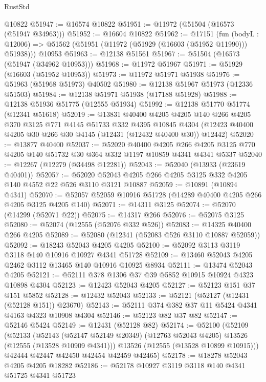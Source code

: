 \begin{lexlean}{RustStd}
\begin{coremodule}
    @10822
@51947 := @16574 @10822
@51951 := @11972 (@51504 (@16573 (@51947 @34963)))
@51952 := @16604 @10822
@51962 := @17151
    (fun (bodyL : @12006) => @51562 (@51951 (@11972 (@51929 (@16603 (@51952 @11990))) @51938)))
    @10953
@51963 := @12138 @51561
@51967 := @51504 (@16573 (@51947 (@34962 @10953)))
@51968 := @11972 @51967
@51971 := @51929 (@16603 (@51952 @10953))
@51973 := @11972 @51971 @51938
@51976 := @51963 (@51968 @51973) @40502
@51980 := @12138 @51967 @51973 (@12336 @51503)
@51984 := @12138 @51971 @51938 (@17188 @51928)
@51988 := @12138 @51936 @51775 (@12555 @51934)
@51992 := @12138 @51770 @51774 (@12341 @51618)
@52019 := @13831
    @40400
    @4205
    @4205
    @140
    @266
    @4205
    @370
    @3125
    @771
    @4145
    @51733
    @332
    @4395
    @10845
    @4304
    (@12423 @40400 @4205 @30 @266 @30 @4145 (@12431 (@12432 @40400 @30)) @12442)
@52020 := @13877 @40400
@52037 := @52020
    @40400
    @4205
    @266
    @4205
    @3125
    @770
    @4205
    @140
    @51732
    @30
    @364
    @332
    @1197
    @10859
    @4341
    @4341
    @5337
@52040 := @12267 (@12279 (@34498 @12281))
@52043 := @52040 (@13933 (@23619 @40401))
@52057 := @52020 @52043 @4205 @266 @4205 @3125 @332 @4205 @140 @4552 @22 @526 @3110 @3121 @10887
@52059 := @10891 (@10894 @4341)
@52070 := @52057 @52059 @10916 @51728 (@14289 @40400 @4205 @266 @4205 @3125 @4205 @140)
@52071 := @14311 @3125
@52074 := @52070 (@14299 (@52071 @22))
@52075 := @14317 @266
@52076 := @52075 @3125
@52080 := @52074 (@12555 (@52076 @332 @526))
@52083 := @14325 @40400 @266 @4205
@52089 := @52080 (@12341 (@52083 @526 @3110 @10887 @52059))
@52092 := @18243 @52043 @4205 @4205
@52100 := @52092 @3113 @3119 @3118 @140 @10916 @10927 @4341 @51728
@52109 := @13460 @52043 @4205 @2462 @3112 @13465 @140 @10916 @10925 @8934
@52111 := @13474 @52043 @4205
@52121 := @52111 @378 @1306 @37 @39 @5852 @10915 @10924 @4323 @10898 @4304
@52123 := @12423 @52043 @4205
@52127 := @52123 @151 @37 @151 @5852
@52128 := @12432 @52043
@52133 := @52121 (@52127 (@12431 (@52128 @151)) @23670)
@52143 := @52111 @374 @382 @37 @11 @5424 @4341 @4163 @4323 @10908 @4304
@52146 := @52123 @82 @37 @82
@52147 := @52146 @5424
@52149 := @12431 (@52128 @82)
@52174 := @52100
    (@52109
      (@52133
        (@52143 (@52147 @52149 @20349) (@12763 @52043 @4205) @13526 (@12555 (@13528 @10909 @4341)))
        @13526
        (@12555 (@13528 @10899 @10915)))
      @42444
      @42447
      @42450
      @42454
      @42459
      @42465)
@52178 := @18278 @52043 @4205 @4205 @18282
@52186 := @52178 @10927 @3119 @3118 @140 @4341 @51725 @4341 @51723

\end{coremodule}
\end{lexlean}

